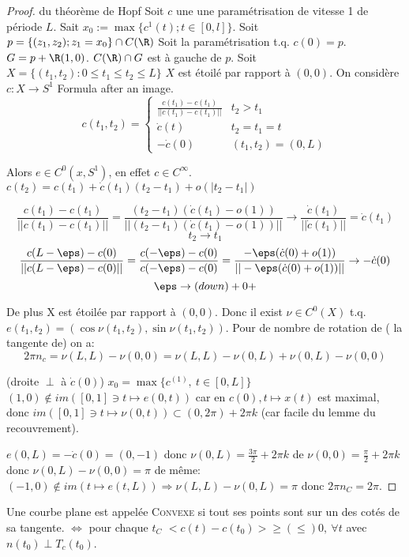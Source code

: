 		\begin{proof}{du théorème de Hopf}
			Soit $c$ une une paramétrisation de vitesse 1 de période $L$. Sait $x_0:=\max\{c^1(t); t\in [0, l]\}$. Soit $p=\{(z_1, z_2); z_1=x_0\}\cap C(\R)$
			Soit la paramétrisation t.q. $c(0)=p$. $G=p+\R(1,0)$. $C(\R)\cap G$ est à gauche de $p$.
			Soit $X=\{(t_1, t_2): 0\leq t_1\leq t_2 \leq L\}$ %
			$X$ est étoilé par rapport à $(0,0)$. On considère $c:X\rightarrow S^1$
			Formula after an image.
			$$c(t_1,t_2)=\left\{ \begin{array}{cr}\frac{c(t_1)-c(t_1)}{||c(t_1)-c(t_1)||} & t_2>t_1 \\ \dot c(t) & t_2=t_1=t \\ -\dot c(0) & (t_1, t_2)=(0,L)\end{array}\right.$$
	
			Alors $e\in C^0(x, S^1)$, en effet $c\in C^\infty.$ $c(t_2)=c(t_1)+\dot c(t_1)(t_2-t_1)+o(|t_2-t_1|)$
	
			$$\frac{c(t_1)-c(t_1)}{||c(t_1)-c(t_1)||}=\frac{(t_2-t_1)(\dot c(t_1)-o(1))}{||(t_2-t_1)(\dot c(t_1)-o(1))||}\to \frac{\dot c(t_1)}{||\dot c(t_1)||}=\dot c(t_1)$$
			$$t_2\to t_1$$
			$$\frac{c(L-\eps)-c(0)}{||c(L-\eps)-c(0)||}=\frac{c(-\eps)-c(0)}{c(-\eps)-c(0)}=\frac{-\eps(\dot c(0)+o(1))}{||-\eps(\dot c(0)+o(1))||}\to -\dot c(0)$$
			$$\eps\to(down) +0+$$
	
			De plus X est étoilée par rapport à $(0,0)$. Donc il exist $\nu\in C^0(X)$ t.q. $e(t_1, t_2)=(\cos \nu(t_1,t_2), \sin \nu(t_1,t_2))$. Pour de nombre de rotation de ( la tangente de) on a:
			$$2\pi n_c=\nu(L,L)-\nu(0,0)=\nu(L,L) - \nu(0,L)+\nu(0,L)-\nu(0,0)$$
	
	
			(droite $\perp$ à $\dot c(0)$) $x_0=\max \{ c^{(1)},\ t\in [0, L]\}$ $(1,0)\not\in im([0,1]\ni t\mapsto e(0,t))$ car en $c(0), t\mapsto x(t)$ est maximal, donc $im([0,1]\ni t\mapsto \nu(0,t))\subset (0,2\pi)+2\pi k$ (car facile du lemme du recouvrement).
	
			$e(0,L)=-\dot c(0)=(0,-1)$ donc $\nu (0,L)=\frac{3\pi}{2}+2\pi k$ de $\nu(0,0)=\frac{\pi}2+2\pi k $ donc $\nu(0,L)-\nu(0,0)=\pi$ de même: $(-1, 0)\not\in im(t\mapsto e(t, L))\Rightarrow \nu(L,L) - \nu(0, L)=\pi$ donc $2\pi n_C=2\pi$.
		\end{proof}

		\begin{definition}
			Une courbe plane est appelée \textsc{Convexe} si tout ses points sont sur un des cotés de sa tangente. $\Leftrightarrow$ pour chaque $t_C$ $<c(t)-c(t_0)>\geq(\leq) 0,\ \forall t$ avec $n(t_0)\perp T_c(t_0)$.
		\end{definition}

